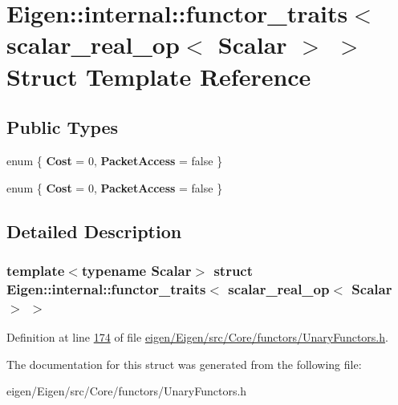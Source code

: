 \hypertarget{struct_eigen_1_1internal_1_1functor__traits_3_01scalar__real__op_3_01_scalar_01_4_01_4}{}\section{Eigen\+:\+:internal\+:\+:functor\+\_\+traits$<$ scalar\+\_\+real\+\_\+op$<$ Scalar $>$ $>$ Struct Template Reference}
\label{struct_eigen_1_1internal_1_1functor__traits_3_01scalar__real__op_3_01_scalar_01_4_01_4}
\subsection*{Public Types}
\begin{DoxyCompactItemize}
\item 
\mbox{\label{struct_eigen_1_1internal_1_1functor__traits_3_01scalar__real__op_3_01_scalar_01_4_01_4_af61737cd65428379f342b230ba267dc7}} 
enum \{ {\bfseries Cost} = 0, 
{\bfseries Packet\+Access} = false
 \}
\item 
\mbox{\label{struct_eigen_1_1internal_1_1functor__traits_3_01scalar__real__op_3_01_scalar_01_4_01_4_a0d53f70c9a9f645525523393dd14e9f5}} 
enum \{ {\bfseries Cost} = 0, 
{\bfseries Packet\+Access} = false
 \}
\end{DoxyCompactItemize}


\subsection{Detailed Description}
\subsubsection*{template$<$typename Scalar$>$\newline
struct Eigen\+::internal\+::functor\+\_\+traits$<$ scalar\+\_\+real\+\_\+op$<$ Scalar $>$ $>$}



Definition at line \hyperlink{eigen_2_eigen_2src_2_core_2functors_2_unary_functors_8h_source_l00174}{174} of file \hyperlink{eigen_2_eigen_2src_2_core_2functors_2_unary_functors_8h_source}{eigen/\+Eigen/src/\+Core/functors/\+Unary\+Functors.\+h}.



The documentation for this struct was generated from the following file\+:\begin{DoxyCompactItemize}
\item 
eigen/\+Eigen/src/\+Core/functors/\+Unary\+Functors.\+h\end{DoxyCompactItemize}
